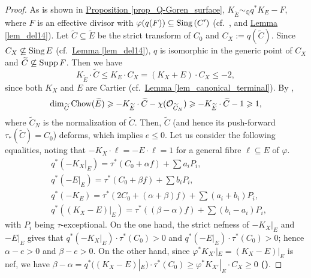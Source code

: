\begin{proof}
As is shown in  {\hyperref[prop_Q-Goren_surface]{Proposition  \ref*{prop_Q-Goren_surface}}}, $K_{\widetilde{E}}\sim_{\mathbb{Q}}q^*K_E-F$, where $F$ is an effective divisor with $\varphi(q(F))\subseteq \textup{Sing}\,(C')$ (cf.~\cite[Lemma 5-1-9]{KMM87}, \cite[(4.1)]{Sak84} and {\hyperref[lem_del14]{Lemma  \ref*{lem_del14}}}).
Let $\widetilde{C}\subseteq \widetilde{E}$ be the strict transform of $C_0$  and $C_X:=q(\widetilde{C})$.
Since $C_X\not\subseteq\textup{Sing}\,E$ (cf.~{\hyperref[lem_del14]{Lemma  \ref*{lem_del14}}}),
$q$ is isomorphic in the generic point of $C_X$ and  $\widetilde{C}\not\subseteq\textup{Supp}\,F$. 
Then we have
\begin{equation}\label{equ_deform}
K_{\widetilde{E}}\cdot \widetilde{C}\leqslant K_E\cdot C_X=(K_X+E)\cdot C_X\leqslant -2,	
\end{equation}
since both $K_X$ and $E$ are Cartier (cf.~{\hyperref[lem_canonical_terminal]{Lemma  \ref*{lem_canonical_terminal}}}). 
By \cite[Chapter 2, Theorem 1.15]{Kollar96},  
$$\dim_{\widetilde{C}}\textup{Chow}(\widetilde{E})\geqslant -K_{\widetilde{E}}\cdot \widetilde{C}-\chi(\mathcal{O}_{\widetilde{C}_N})\geqslant -K_{\widetilde{E}}\cdot \widetilde{C}-1\geqslant 1,$$
where  $\widetilde{C}_N$ is the normalization of $\widetilde{C}$.
Then, $\widetilde{C}$ (and hence its push-forward $\tau_*(\widetilde{C})=C_0$) deforms, which  implies $e\leqslant 0$.
Let us consider the following equalities, noting that $-K_X\cdot \ell=-E\cdot \ell=1$ for a general fibre $\ell\subseteq E$ of $\varphi$.
\begin{align*}
	&q^*(-K_X|_E)=\tau^*(C_0+\alpha f)+\sum a_iP_i,\\
	&q^*(-E|_E)=\tau^*(C_0+\beta f)+\sum b_iP_i,\\
	&q^*(-K_E)=\tau^*(2C_0+(\alpha+\beta)f)+\sum(a_i+b_i)P_i,\\
	&q^*((K_X-E)|_E)=\tau^*((\beta-\alpha)f)+\sum(b_i-a_i)P_i,
\end{align*}
with $P_i$ being $\tau$-exceptional.
On the one hand, the strict nefness of $-K_X|_E$ and $-E|_E$ gives  that $q^*(-K_X|_E)\cdot \tau^*(C_0)>0$ and $q^*(-E|_E)\cdot \tau^*(C_0)>0$; hence $\alpha-e>0$ and $\beta-e>0$.
On the other hand, since $\varphi^*K_{X'}|_E=(K_X-E)|_E$ is nef, we have $\beta-\alpha=q^*((K_X-E)|_E)\cdot \tau^*(C_0)\geqslant  \varphi^*K_{X'}|_E\cdot C_X\geqslant 0$ \hypertarget{1ag}{\textbf{(\dag)}}.


\end{proof}
